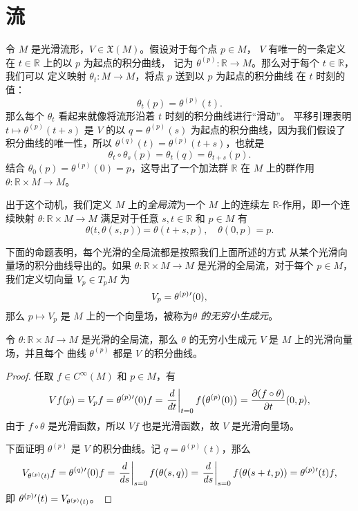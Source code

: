 \documentclass[fontset=none]{Notes}
\begin{document}
\section{流}

令 $M$ 是光滑流形，$V\in \mathfrak{X}(M)$。假设对于每个点 $p\in M$，
$V$ 有唯一的一条定义在 $t\in \mathbb{R}$ 上的以 $p$ 为起点的积分曲线，
记为 $\theta^{(p)}:\mathbb{R}\to M$。那么对于每个 $t\in \mathbb{R}$，我们可以
定义映射 $\theta_t:M\to M$，将点 $p$ 送到以 $p$ 为起点的积分曲线
在 $t$ 时刻的值：
\[
  \theta_t(p)=\theta^{(p)}(t).  
\]
那么每个 $\theta_t$ 看起来就像将流形沿着 $t$ 时刻的积分曲线进行“滑动”。
平移引理表明 $t\mapsto \theta^{(p)}(t+s)$ 是 $V$ 的以 $q=\theta^{(p)}(s)$
为起点的积分曲线，因为我们假设了积分曲线的唯一性，所以
$\theta^{(q)}(t)=\theta^{(p)}(t+s)$，也就是
\[
  \theta_t\circ\theta_s(p)=\theta_t(q)=\theta_{t+s}(p).
\]
结合 $\theta_0(p)=\theta^{(p)}(0)=p$，这导出了一个加法群 $\mathbb{R}$
在 $M$ 上的群作用 $\theta:\mathbb{R}\times M\to M$。

出于这个动机，我们定义 $M$ 上的\emph{全局流}为一个 $M$
上的连续左 $\mathbb{R}$-作用，即一个连续映射 $\theta:\mathbb{R}\times M\to M$
满足对于任意 $s,t\in \mathbb{R}$ 和 $p\in M$ 有
\begin{equation}
  \theta\bigl(t,\theta(s,p)\bigr)=\theta(t+s,p),\quad
  \theta(0,p)=p.
\end{equation}

下面的命题表明，每个光滑的全局流都是按照我们上面所述的方式
从某个光滑向量场的积分曲线导出的。如果 $\theta:\mathbb{R}\times M\to M$
是光滑的全局流，对于每个 $p\in M$，我们定义切向量 $V_p\in T_pM$ 为
\[
  V_p=\smash{\theta^{(p)}}'(0),
\]
那么 $p\mapsto V_p$ 是 $M$ 上的一个向量场，被称为\emph{$\theta$ 的无穷小生成元}。

\begin{proposition}
  令 $\theta:\mathbb{R}\times M\to M$ 是光滑的全局流，那么
  $\theta$ 的无穷小生成元 $V$ 是 $M$ 上的光滑向量场，并且每个
  曲线 $\theta^{(p)}$ 都是 $V$ 的积分曲线。
\end{proposition}
\begin{proof}
  任取 $f\in C^\infty(M)$ 和 $p\in M$，有
  \[
    Vf(p)=V_pf=  \smash{\theta^{(p)}}'(0)f=
    \left.\frac{d}{dt}\right|_{t=0}f\bigl(\theta^{(p)}(0)\bigr)
    =\frac{\partial (f\circ\theta)}{\partial t}(0,p),
  \]
  由于 $f\circ\theta$ 是光滑函数，所以 $Vf$ 也是光滑函数，故
  $V$ 是光滑向量场。

  下面证明 $\theta^{(p)}$ 是 $V$ 的积分曲线。记 $q=\theta^{(p)}(t)$，那么
  \[
    V_{\theta^{(p)}(t)}f=\smash{\theta^{(q)}}'(0)f
    =\left.\frac{d}{ds}\right|_{s=0}f(\theta(s,q))
    =\left.\frac{d}{ds}\right|_{s=0}f(\theta(s+t,p))
    =\smash{\theta^{(p)}}'(t)f,
  \]
  即 $\smash{\theta^{(p)}}'(t)=V_{\theta^{(p)}(t)}$。
\end{proof}
\end{document}
